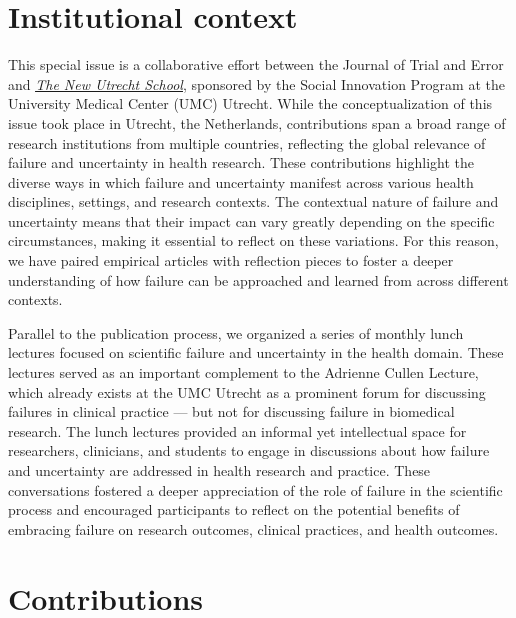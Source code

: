 \documentclass[authordate, empirical, issue]{jote-new-article}
\begin{document}
	\section{Institutional context}



	This special issue is a collaborative effort between the Journal of Trial and Error and \emph{\underline{\href{https://www.uu.nl/en/research/the-new-utrecht-school}{The New Utrecht School}}}, sponsored by the Social Innovation Program at the University Medical Center (UMC) Utrecht. While the conceptualization of this issue took place in Utrecht, the Netherlands, contributions span a broad range of research institutions from multiple countries, reflecting the global relevance of failure and uncertainty in health research. These contributions highlight the diverse ways in which failure and uncertainty manifest across various health disciplines, settings, and research contexts. The contextual nature of failure and uncertainty means that their impact can vary greatly depending on the specific circumstances, making it essential to reflect on these variations. For this reason, we have paired empirical articles with reflection pieces to foster a deeper understanding of how failure can be approached and learned from across different contexts.



	Parallel to the publication process, we organized a series of monthly lunch lectures focused on scientific failure and uncertainty in the health domain. These lectures served as an important complement to the Adrienne Cullen Lecture, which already exists at the UMC Utrecht as a prominent forum for discussing failures in clinical practice — but not for discussing failure in biomedical research. The lunch lectures provided an informal yet intellectual space for researchers, clinicians, and students to engage in discussions about how failure and uncertainty are addressed in health research and practice. These conversations fostered a deeper appreciation of the role of failure in the scientific process and encouraged participants to reflect on the potential benefits of embracing failure on research outcomes, clinical practices, and health outcomes.







	\section{Contributions }
\end{document}

